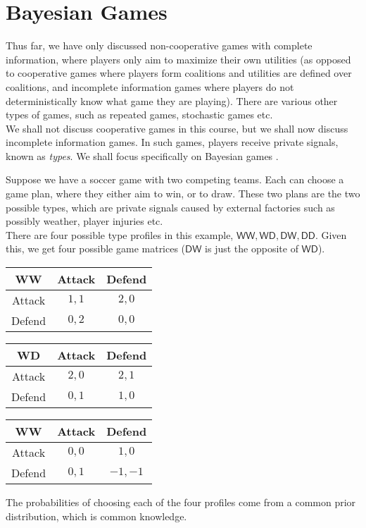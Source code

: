 
\section{Bayesian Games}

	Thus far, we have only discussed non-cooperative games with complete information, where players only aim to maximize their own utilities (as opposed to cooperative games where players form coalitions and utilities are defined over coalitions, and incomplete information games where players do not deterministically know what game they are playing). There are various other types of games, such as repeated games, stochastic games etc. \\
	We shall not discuss cooperative games in this course, but we shall now discuss incomplete information games. In such games, players receive private signals, known as \emph{types}. We shall focus specifically on Bayesian games \cite{bayesian-games}.

	\begin{fex}
		Suppose we have a soccer game with two competing teams. Each can choose a game plan, where they either aim to win, or to draw. These two plans are the two possible types, which are private signals caused by external factories such as possibly weather, player injuries etc.\\
		There are four possible type profiles in this example, $\mathsf{WW},\mathsf{WD},\mathsf{DW},\mathsf{DD}$. Given this, we get four possible game matrices ($\mathsf{DW}$ is just the opposite of $\mathsf{WD}$).
		\begin{center}
		\begin{tabular}{|c||c|c|}
			\hline
			\textsf{WW} & \textsf{Attack} & \textsf{Defend} \\
			\hline\hline
			\textsf{Attack} & $1,1$ & $2,0$ \\
			\hline
			\textsf{Defend} & $0,2$ & $0,0$ \\
			\hline 
		\end{tabular} 
		\begin{tabular}{|c||c|c|}
			\hline
			\textsf{WD} & \textsf{Attack} & \textsf{Defend} \\
			\hline\hline
			\textsf{Attack} & $2,0$ & $2,1$ \\
			\hline
			\textsf{Defend} & $0,1$ & $1,0$ \\
			\hline 
		\end{tabular}
		\begin{tabular}{|c||c|c|}
			\hline
			\textsf{WW} & \textsf{Attack} & \textsf{Defend} \\
			\hline\hline
			\textsf{Attack} & $0,0$ & $1,0$ \\
			\hline
			\textsf{Defend} & $0,1$ & $-1,-1$ \\
			\hline 
		\end{tabular}
		\end{center}

		The probabilities of choosing each of the four profiles come from a common prior distribution, which is common knowledge.
	\end{fex}

